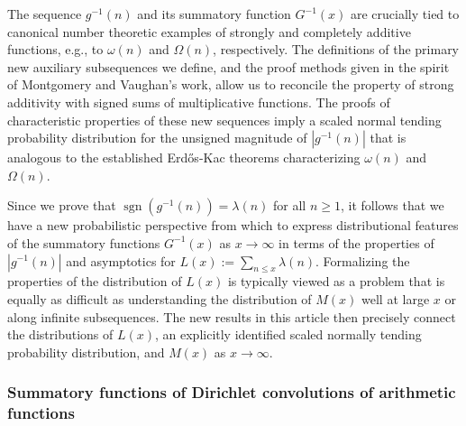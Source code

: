 \documentclass[11pt,reqno,a4letter]{article}
\numberwithin{figure}{section}
\numberwithin{table}{section}
\theoremstyle{plain}
\numberwithin{theorem}{section}
\theoremstyle{definition}
\begin{document}
The sequence $g^{-1}(n)$ and its summatory function 
$G^{-1}(x)$ are crucially tied to 
canonical number theoretic examples of strongly and completely additive functions, 
e.g., to $\omega(n)$ and $\Omega(n)$, respectively. 
The definitions of the primary new auxiliary subsequences we define, and the 
proof methods given in the spirit of Montgomery and Vaughan's work, 
allow us to reconcile the property of strong additivity with signed sums of 
multiplicative functions. 
The proofs of characteristic properties of these new sequences 
imply a scaled normal tending probability distribution for the unsigned 
magnitude of $|g^{-1}(n)|$ that is analogous to the established Erd\H{o}s-Kac theorems 
characterizing $\omega(n)$ and $\Omega(n)$. 

Since we prove that $\operatorname{sgn}(g^{-1}(n)) = \lambda(n)$ for all $n \geq 1$, it follows 
that we have a new probabilistic perspective from which to express distributional features of 
the summatory functions $G^{-1}(x)$ as $x \rightarrow \infty$ in terms of the properties of 
$|g^{-1}(n)|$ and asymptotics for $L(x) := \sum_{n \leq x} \lambda(n)$. 
Formalizing the properties of the distribution of 
$L(x)$ is typically viewed as a problem that is equally as difficult 
as understanding the distribution of $M(x)$ well at large $x$ or along infinite subsequences. 
The new results in this article then precisely 
connect the distributions of $L(x)$, an explicitly identified 
scaled normally tending probability distribution, and $M(x)$ as $x \rightarrow \infty$. 

\subsubsection{Summatory functions of Dirichlet convolutions of arithmetic functions} 
\end{document}
